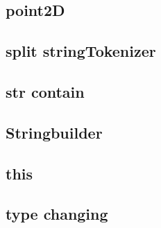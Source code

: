     \subsection{point2D}
             
    \subsection{split stringTokenizer}
        
    \subsection{str contain}
        
    \subsection{Stringbuilder}
             
    \subsection{this}
        
    \subsection{type changing}
        